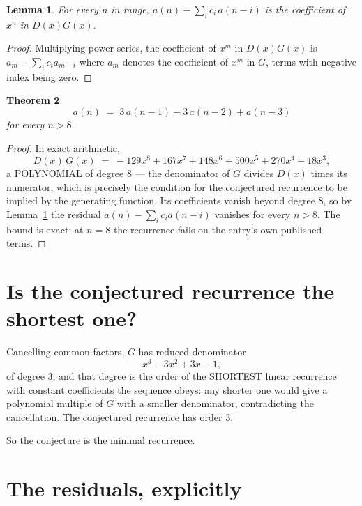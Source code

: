 \documentclass[11pt,a4paper]{article}
\theoremstyle{plain}
\newtheorem{theorem}{Theorem}
\newtheorem{lemma}[theorem]{Lemma}
\theoremstyle{definition}
\begin{document}
\begin{lemma}\label{lem:key}
For every $n$ in range, $a(n)-\sum_i c_i\,a(n-i)$ is the coefficient of $x^{n}$ in
$D(x)G(x)$.
\end{lemma}

\begin{proof}
Multiplying power series, the coefficient of $x^{m}$ in $D(x)G(x)$ is
$a_m-\sum_i c_i a_{m-i}$ where $a_m$ denotes the coefficient of $x^{m}$ in $G$, terms with
negative index being zero.
\end{proof}

\begin{theorem}
\[
a(n)\;=\;3\,a(n-1) - 3\,a(n-2) + a(n-3)
\]
for every $n>8$.
\end{theorem}

\begin{proof}
In exact arithmetic,
\[
D(x)\,G(x)\;=\;- 129 x^{8} + 167 x^{7} + 148 x^{6} + 500 x^{5} + 270 x^{4} + 18 x^{3},
\]
a POLYNOMIAL of degree $8$ --- the denominator of $G$ divides $D(x)$ times its numerator,
which is precisely the condition for the conjectured recurrence to be implied by the
generating function. Its coefficients vanish beyond degree $8$, so by
Lemma~\ref{lem:key} the residual $a(n)-\sum_ic_ia(n-i)$ vanishes for every
$n>8$. The bound is exact: at $n=8$ the recurrence fails on the entry's own published terms.
\end{proof}

\section{Is the conjectured recurrence the shortest one?}

Cancelling common factors, $G$ has reduced denominator
\[
x^{3} - 3 x^{2} + 3 x - 1,
\]
of degree $3$, and that degree is the order of the SHORTEST linear recurrence with
constant coefficients the sequence obeys: any shorter one would give a polynomial multiple of
$G$ with a smaller denominator, contradicting the cancellation. The conjectured recurrence has
order $3$.

So the conjecture is the minimal recurrence.

\section{The residuals, explicitly}
\end{document}
